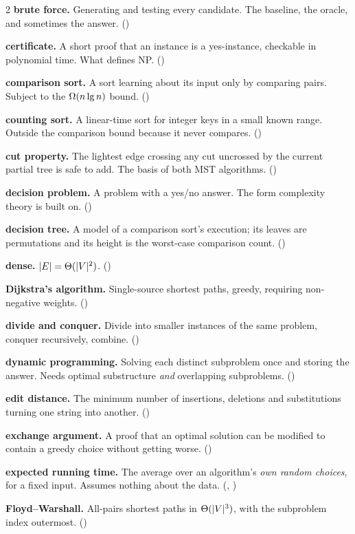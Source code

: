 \begin{multicols}{2}
\textbf{brute force.} Generating and testing every candidate. The baseline, the
oracle, and sometimes the answer. ()

\textbf{certificate.} A short proof that an instance is a yes-instance,
checkable in polynomial time. What defines NP. ()

\textbf{comparison sort.} A sort learning about its input only by comparing
pairs. Subject to the $\Omega(n\operatorname{lg} n)$ bound. ()

\textbf{counting sort.} A linear-time sort for integer keys in a small known
range. Outside the comparison bound because it never compares.
()

\textbf{cut property.} The lightest edge crossing any cut uncrossed by the
current partial tree is safe to add. The basis of both MST algorithms.
()

\textbf{decision problem.} A problem with a yes/no answer. The form complexity
theory is built on. ()

\textbf{decision tree.} A model of a comparison sort's execution; its leaves
are permutations and its height is the worst-case comparison count.
()

\textbf{dense.} $|E| = \Theta(|V|^{2})$. ()

\textbf{Dijkstra's algorithm.} Single-source shortest paths, greedy, requiring
non-negative weights. ()

\textbf{divide and conquer.} Divide into smaller instances of the same problem,
conquer recursively, combine. ()

\textbf{dynamic programming.} Solving each distinct subproblem once and storing
the answer. Needs optimal substructure \emph{and} overlapping subproblems.
()

\textbf{edit distance.} The minimum number of insertions, deletions and
substitutions turning one string into another. ()

\textbf{exchange argument.} A proof that an optimal solution can be modified to
contain a greedy choice without getting worse. ()

\textbf{expected running time.} The average over an algorithm's \emph{own
random choices}, for a fixed input. Assumes nothing about the data.
(, )

\textbf{Floyd--Warshall.} All-pairs shortest paths in $\Theta(|V|^{3})$, with
the subproblem index outermost. ()


\end{multicols}
